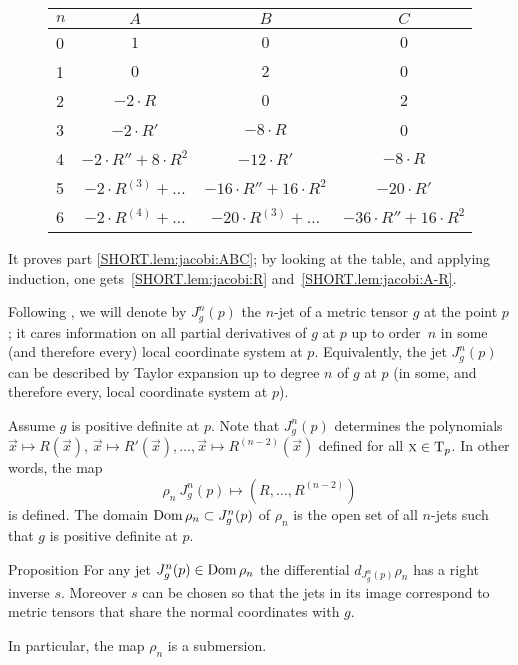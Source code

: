 \documentclass[a4paper,10pt]{article}
\begin{document}
\renewcommand{\arraystretch}{1.5}
\begin{figure}[!ht]
\centering
\begin{tabular}{ l|c|c|c }
$n$ & $A$ & $B$ & $C$ \\ \hline
0& $1$   &  $0$  & $0$ \\ \hline
1& $0$   &  $2$  & $0$ \\ \hline 
2& $-2\cdot R$ & $0$ & $2$ \\ \hline 
3& $-2\cdot R'$ & $-8\cdot R$ & 0  \\ \hline 
4& $-2\cdot R''+8\cdot R^2$ & $-12\cdot R'$ & $-8\cdot R$  \\ \hline
5& $-2\cdot R^{(3)}+\dots$ 
& $-16\cdot R''+16\cdot R^2$ & $-20\cdot R'$  \\ \hline
6
&$-2\cdot R^{(4)}+\dots$
&$-20\cdot R^{(3)}+\dots$
&$-36\cdot R''+16\cdot R^2$
\\
\end{tabular}
\end{figure} 

It proves part \ref{SHORT.lem:jacobi:ABC};
by looking at the table, and applying induction, one gets~\ref{SHORT.lem:jacobi:R} and~\ref{SHORT.lem:jacobi:A-R}.\qeds

Following \cite{eliashberg-mishachev}, we will denote by $J^n_g(p)$ the $n$-jet of a metric tensor $g$ at the point $p$;
it cares information on all partial derivatives of $g$ at $p$ up to order~$n$ in some (and therefore every) local coordinate system at $p$.
Equivalently, the jet $J^n_g(p)$ can be described by Taylor expansion up to degree $n$ of $g$ at $p$ (in some, and therefore every, local coordinate system at $p$).

Assume $g$ is positive definite at $p$.
Note that $J^n_g(p)$ determines the polynomials 
$\vec{x}\mapsto R(\vec{x})$, $\vec{x}\mapsto R'(\vec{x}),\dots, \vec{x}\mapsto R^{(n-2)}(\vec{x})$ defined for all $\text{\sc{x}}\in \mathrm{T}_p$. 
In other words, the map 
\[\rho_n\:J^n_g(p)\mapsto (R,\dots,R^{(n-2)})\]
is defined.
The domain $\mathop{\rm Dom}\nolimits \rho_n\subset J^n_g(p)$ of $\rho_n$ is the open set of all $n$-jets such that $g$ is positive definite at $p$.

\begin{thm}{Proposition}\label{prop:submersion}
For any jet $J^n_g(p)\z\in \Dom \rho_n$ the differential $d_{J^n_g(p)}\rho_n$ has a right inverse $s$.
Moreover $s$ can be chosen so that the jets in its image correspond to metric tensors that share the normal coordinates with $g$.

In particular, the map $\rho_n$ is a submersion.
\end{thm}
\end{document}
